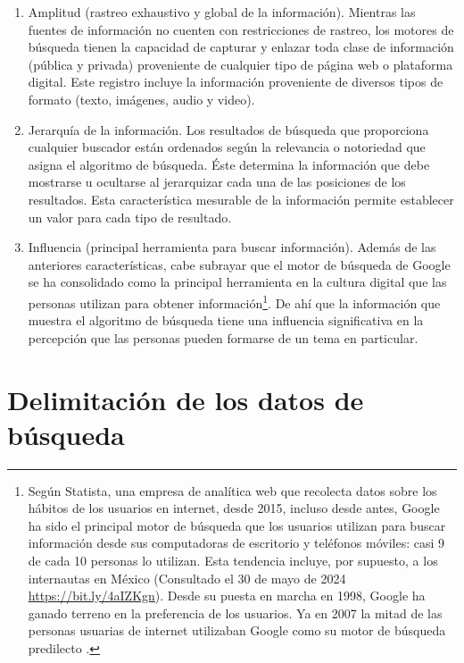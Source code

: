 \documentclass[
  spanish,
  11pt,
  a4paper,
]{scrbook}
\begin{document}
\begin{enumerate}
\def\labelenumi{\arabic{enumi}.}
\item
  Amplitud (rastreo exhaustivo y global de la información). Mientras las
  fuentes de información no cuenten con restricciones de rastreo, los
  motores de búsqueda tienen la capacidad de capturar y enlazar toda
  clase de información (pública y privada) proveniente de cualquier tipo
  de página web o plataforma digital. Este registro incluye la
  información proveniente de diversos tipos de formato (texto, imágenes,
  audio y video).
\item
  Jerarquía de la información. Los resultados de búsqueda que
  proporciona cualquier buscador están ordenados según la relevancia o
  notoriedad que asigna el algoritmo de búsqueda. Éste determina la
  información que debe mostrarse u ocultarse al jerarquizar cada una de
  las posiciones de los resultados. Esta característica mesurable de la
  información permite establecer un valor para cada tipo de resultado.
\item
  Influencia (principal herramienta para buscar información). Además de
  las anteriores características, cabe subrayar que el motor de búsqueda
  de Google se ha consolidado como la principal herramienta en la
  cultura digital que las personas utilizan para obtener
  información\footnote{Según Statista, una empresa de analítica web que
    recolecta datos sobre los hábitos de los usuarios en internet, desde
    2015, incluso desde antes, Google ha sido el principal motor de
    búsqueda que los usuarios utilizan para buscar información desde sus
    computadoras de escritorio y teléfonos móviles: casi 9 de cada 10
    personas lo utilizan. Esta tendencia incluye, por supuesto, a los
    internautas en México (Consultado el 30 de mayo de 2024
    \href{https://bit.ly/4aIZKgn}{\ul{https://bit.ly/4aIZKgn}}). Desde
    su puesta en marcha en 1998, Google ha ganado terreno en la
    preferencia de los usuarios. Ya en 2007 la mitad de las personas
    usuarias de internet utilizaban Google como su motor de búsqueda
    predilecto \autocite[6]{Halavais2009}.}. De ahí que la información
  que muestra el algoritmo de búsqueda tiene una influencia
  significativa en la percepción que las personas pueden formarse de un
  tema en particular.
\end{enumerate}

\section*{Delimitación de los datos de
búsqueda}\label{delimitaciuxf3n-de-los-datos-de-buxfasqueda}
\end{document}
